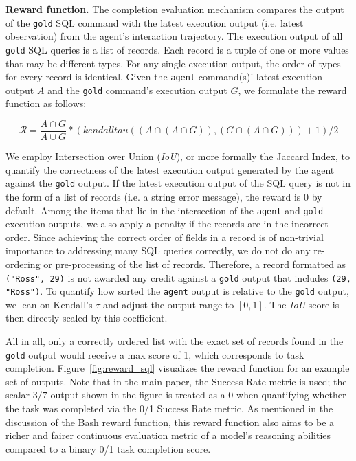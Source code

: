 \textbf{Reward function.} The completion evaluation mechanism compares the output of the \texttt{gold} SQL command with the latest execution output (i.e. latest observation) from the agent's interaction trajectory. The execution output of all \texttt{gold} SQL queries is a list of records. Each record is a tuple of one or more values that may be different types. For any single execution output, the order of types for every record is identical. Given the \texttt{agent} command(s)' latest execution output $A$ and the \texttt{gold} command's execution output $G$, we formulate the reward function as follows:

\begin{equation}
    \label{eq:reward_sql}
    \mathcal{R} = \frac{A \cap G}{A \cup G} * (kendalltau((A \cap (A \cap G)), (G \cap (A \cap G))) + 1) / 2
\end{equation}

We employ Intersection over Union (\textit{IoU}), or more formally the Jaccard Index, to quantify the correctness of the latest execution output generated by the agent against the \texttt{gold} output. If the latest execution output of the SQL query is not in the form of a list of records (i.e. a string error message), the reward is $0$ by default. Among the items that lie in the intersection of the \texttt{agent} and \texttt{gold} execution outputs, we also apply a penalty if the records are in the incorrect order. Since achieving the correct order of fields in a record is of non-trivial importance to addressing many SQL queries correctly, we do not do any re-ordering or pre-processing of the list of records. Therefore, a record formatted as \texttt{("Ross", 29)} is not awarded any credit against a \texttt{gold} output that includes \texttt{(29, "Ross")}. To quantify how sorted the \texttt{agent} output is relative to the \texttt{gold} output, we lean on Kendall's $\tau$ and adjust the output range to $[0, 1]$. The \textit{IoU} score is then directly scaled by this coefficient.

All in all, only a correctly ordered list with the exact set of records found in the \texttt{gold} output would receive a max score of 1, which corresponds to task completion.
Figure~\ref{fig:reward_sql} visualizes the reward function for an example set of outputs. Note that in the main paper, the Success Rate metric is used; the scalar $3/7$ output shown in the figure is treated as a 0 when quantifying whether the task was completed via the 0/1 Success Rate metric. As mentioned in the discussion of the Bash reward function, this reward function also aims to be a richer and fairer continuous evaluation metric of a model's reasoning abilities compared to a binary 0/1 task completion score.

